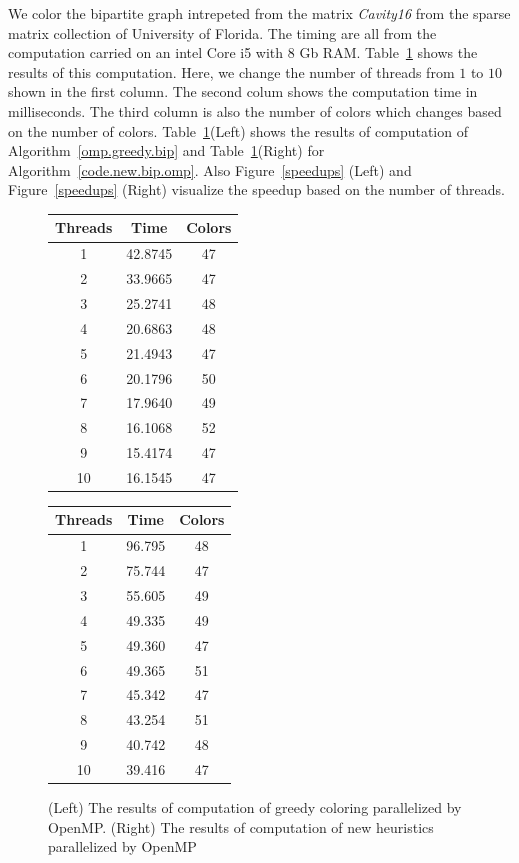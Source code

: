 \documentclass[12pt, twoside]{book}
\newcommand{\figref}[1]{Figure~\protect\ref{#1}}
\newcommand{\coderef}[1]{Algorithm~\protect\ref{#1}}
\begin{document}
We color the bipartite graph intrepeted from the matrix \textit{Cavity16}
from the sparse matrix collection of University of Florida.
The timing are all from the computation carried on an intel Core i5 with 8 Gb RAM.
Table~\ref{omp.res} shows the results of this computation.
Here, we change the number of threads from $1$ to $10$ shown in the first column.
The second colum shows the computation time in milliseconds. The third column
is also the number of colors which changes based on the number of colors.
Table~\ref{omp.res}(Left) shows the results of computation of \coderef{omp.greedy.bip}
and Table~\ref{omp.res}(Right) for \coderef{code.new.bip.omp}.
Also \figref{speedups} (Left) and \figref{speedups} (Right) visualize the speedup
based on the number of threads.
\begin{figure}
\begin{tabular}{|c|c|c|}
\hline
Threads & Time & Colors \\\hline
1 & 42.8745 & 47 \\\hline
2 & 33.9665 & 47 \\\hline
3 & 25.2741 & 48 \\\hline
4 & 20.6863 & 48 \\\hline
5 & 21.4943 & 47 \\\hline
6 & 20.1796 & 50 \\\hline
7 & 17.9640 & 49 \\\hline
8 & 16.1068 & 52 \\\hline
9 & 15.4174 & 47 \\\hline
10 & 16.1545 & 47 \\\hline
\end{tabular}\hfill
\begin{tabular}{|c|c|c|}
\hline
Threads & Time & Colors \\\hline
1 & 96.795 & 48 \\\hline
2 & 75.744 & 47 \\\hline
3 & 55.605 & 49 \\\hline
4 & 49.335 & 49 \\\hline
5 & 49.360 & 47 \\\hline
6 & 49.365 & 51 \\\hline
7 & 45.342 & 47 \\\hline
8 & 43.254 & 51 \\\hline
9 & 40.742 & 48 \\\hline
10 & 39.416 & 47 \\\hline
\end{tabular}
\caption{
(Left) The results of computation of greedy coloring parallelized by OpenMP.
(Right) The results of computation of new heuristics parallelized by OpenMP}
\label{omp.res}
\end{figure}
\end{document}

